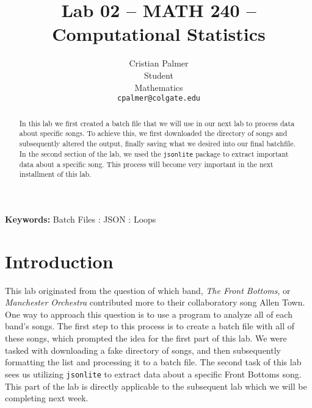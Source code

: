 \documentclass{article}\usepackage[]{graphicx}\usepackage[]{xcolor}
\begin{document}
\vspace{-1in}
\title{Lab 02 -- MATH 240 -- Computational Statistics}

\author{
  Cristian Palmer \\
  Student  \\
  Mathematics  \\
  {\tt cpalmer@colgate.edu}
}

\date{}

\maketitle

\begin{multicols}{2}
\begin{abstract}
In this lab we first created a batch file that we will use in our next lab to process data about specific songs. To achieve this, we first downloaded the directory of songs and subsequently altered the output, finally saving what we desired into our final batchfile. In the second section of the lab, we used the \texttt{jsonlite} package to extract important data about a specific song. This process will become very important in the next installment of this lab.   
\end{abstract}

\noindent \textbf{Keywords:} Batch Files : JSON : Loops

\section{Introduction}
This lab originated from the question of which band,  \textit{The Front Bottoms}, or \textit{Manchester Orchestra} contributed more to their collaboratory song Allen Town. One way to approach this question is to use a program to analyze all of each band's songs. The first step to this process is to create a batch file with all of these songs, which prompted the idea for the first part of this lab. We were tasked with downloading a fake directory of songs, and then subsequently formatting the list and processing it to a batch file. The second task of this lab sees us utilizing \texttt{jsonlite} to extract data about a specific Front Bottoms song. This part of the lab is directly applicable to the subsequent lab which we will be completing next week.


\end{multicols}
\end{document}
